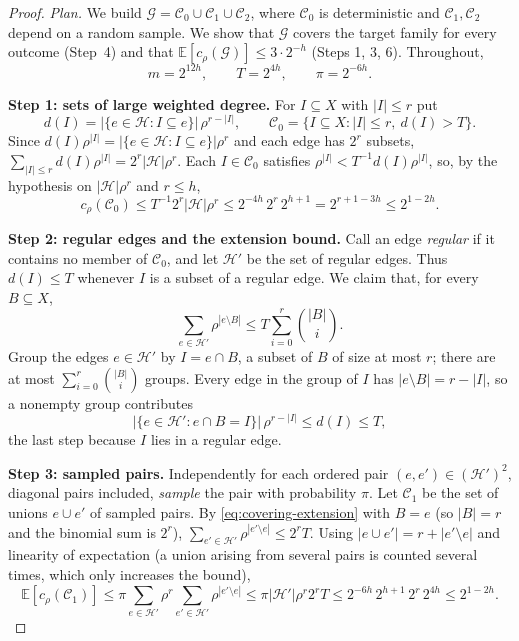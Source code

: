 \documentclass[11pt,letterpaper]{article}
\theoremstyle{definition}
\theoremstyle{remark}
\numberwithin{equation}{section}
\newcommand{\step}[1]{\par\smallskip\noindent\textbf{#1}\enspace}
\begin{document}
\begin{proof}
\emph{Plan.} We build
$\mathcal G=\mathcal C_0\cup\mathcal C_1\cup\mathcal C_2$, where
$\mathcal C_0$ is deterministic and $\mathcal C_1,\mathcal C_2$ depend on
a random sample. We show that $\mathcal G$ covers the target family for
every outcome (Step~4) and that
$\mathbb E[c_\rho(\mathcal G)]\le3\cdot2^{-h}$ (Steps 1, 3, 6).
Throughout,
\[
m=2^{12h},\qquad T=2^{4h},\qquad \pi=2^{-6h}.
\]

\step{Step 1: sets of large weighted degree.}
For $I\subseteq X$ with $|I|\le r$ put
\[
d(I)=|\{e\in\mathcal H:I\subseteq e\}|\,\rho^{r-|I|},
\qquad
\mathcal C_0=\{I\subseteq X:|I|\le r,\ d(I)>T\}.
\]
Since $d(I)\rho^{|I|}=|\{e\in\mathcal H:I\subseteq e\}|\rho^r$ and each
edge has $2^r$ subsets,
$\sum_{|I|\le r}d(I)\rho^{|I|}=2^r|\mathcal H|\rho^r$. Each
$I\in\mathcal C_0$ satisfies $\rho^{|I|}<T^{-1}d(I)\rho^{|I|}$, so, by
the hypothesis on $|\mathcal H|\rho^r$ and $r\le h$,
\begin{equation}\label{eq:covering-initial-cost}
c_\rho(\mathcal C_0)
\le T^{-1}2^r|\mathcal H|\rho^r
\le2^{-4h}\,2^r\,2^{h+1}=2^{r+1-3h}\le2^{1-2h}.
\end{equation}

\step{Step 2: regular edges and the extension bound.}
Call an edge \emph{regular} if it contains no member of $\mathcal C_0$,
and let $\mathcal H'$ be the set of regular edges. Thus $d(I)\le T$
whenever $I$ is a subset of a regular edge. We claim that, for every
$B\subseteq X$,
\begin{equation}\label{eq:covering-extension}
\sum_{e\in\mathcal H'}\rho^{|e\setminus B|}
\le T\sum_{i=0}^r\binom{|B|}{i}.
\end{equation}
Group the edges $e\in\mathcal H'$ by $I=e\cap B$, a subset of $B$ of
size at most $r$; there are at most $\sum_{i=0}^r\binom{|B|}{i}$ groups.
Every edge in the group of $I$ has $|e\setminus B|=r-|I|$, so a nonempty
group contributes
\[
|\{e\in\mathcal H':e\cap B=I\}|\,\rho^{r-|I|}\le d(I)\le T,
\]
the last step because $I$ lies in a regular edge.

\step{Step 3: sampled pairs.}
Independently for each ordered pair $(e,e')\in(\mathcal H')^2$, diagonal
pairs included, \emph{sample} the pair with probability $\pi$. Let
$\mathcal C_1$ be the set of unions $e\cup e'$ of sampled pairs.
By \eqref{eq:covering-extension} with $B=e$ (so $|B|=r$ and the binomial
sum is $2^r$), $\sum_{e'\in\mathcal H'}\rho^{|e'\setminus e|}\le2^rT$.
Using $|e\cup e'|=r+|e'\setminus e|$ and linearity of expectation (a
union arising from several pairs is counted several times, which only
increases the bound),
\begin{equation}\label{eq:covering-pair-cost}
\mathbb E[c_\rho(\mathcal C_1)]
\le\pi\sum_{e\in\mathcal H'}\rho^r\sum_{e'\in\mathcal H'}\rho^{|e'\setminus e|}
\le\pi|\mathcal H'|\rho^r2^rT
\le2^{-6h}\,2^{h+1}\,2^r\,2^{4h}\le2^{1-2h}.
\end{equation}


\end{proof}
\end{document}
